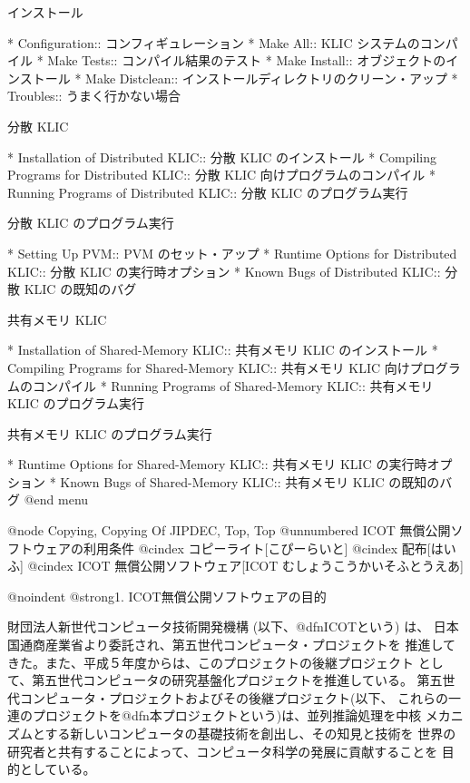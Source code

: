 インストール

* Configuration::               コンフィギュレーション
* Make All::                    KLIC システムのコンパイル
* Make Tests::                  コンパイル結果のテスト
* Make Install::                オブジェクトのインストール
* Make Distclean::              インストールディレクトリのクリーン・アップ
* Troubles::                    うまく行かない場合

分散 KLIC

* Installation of Distributed KLIC::        分散 KLIC のインストール
* Compiling Programs for Distributed KLIC:: 分散 KLIC 向けプログラムのコンパイル
* Running Programs of Distributed KLIC::    分散 KLIC のプログラム実行

分散 KLIC のプログラム実行

* Setting Up PVM::                          PVM のセット・アップ
* Runtime Options for Distributed KLIC::    分散 KLIC の実行時オプション
* Known Bugs of Distributed KLIC::          分散 KLIC の既知のバグ

共有メモリ KLIC 

* Installation of Shared-Memory KLIC::      共有メモリ KLIC のインストール
* Compiling Programs for Shared-Memory KLIC::   共有メモリ KLIC 向けプログラムのコンパイル
* Running Programs of Shared-Memory KLIC::  共有メモリ KLIC のプログラム実行

共有メモリ KLIC のプログラム実行

* Runtime Options for Shared-Memory KLIC::  共有メモリ KLIC の実行時オプション
* Known Bugs of Shared-Memory KLIC::        共有メモリ KLIC の既知のバグ
@end menu

@node Copying, Copying Of JIPDEC, Top, Top
@unnumbered ICOT 無償公開ソフトウェアの利用条件
@cindex コピーライト[こぴーらいと]
@cindex 配布[はいふ]
@cindex ICOT 無償公開ソフトウェア[ICOT むしょうこうかいそふとうえあ]

@noindent
@strong{1. ICOT無償公開ソフトウェアの目的}

財団法人新世代コンピュータ技術開発機構 (以下、@dfn{ICOT}という) は、
日本国通商産業省より委託され、第五世代コンピュータ・プロジェクトを
推進してきた。また、平成５年度からは、このプロジェクトの後継プロジェクト
として、第五世代コンピュータの研究基盤化プロジェクトを推進している。
第五世代コンピュータ・プロジェクトおよびその後継プロジェクト(以下、
これらの一連のプロジェクトを@dfn{本プロジェクトという})は、並列推論処理を中核
メカニズムとする新しいコンピュータの基礎技術を創出し、その知見と技術を
世界の研究者と共有することによって、コンピュータ科学の発展に貢献することを
目的としている。

